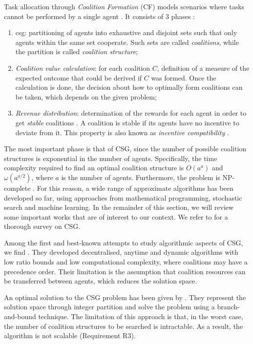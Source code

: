 Task allocation through \emph{Coalition Formation} (CF) models scenarios where tasks
cannot be performed by a single agent \cite{shehory1998}. It consists of $3$
phases \cite{sandholm1999}:
\begin{enumerate}
    \item \gls{csg}: partitioning of agents into exhaustive and disjoint sets such that
        only agents within the same set cooperate. Such sets are called \emph{coalitions},
        while the partition is called \emph{coalition structure};
    \item \emph{Coalition value calculation}: for each coalition $C$, definition of a
        measure of the expected outcome that could be derived if $C$ was formed. Once the
        calculation is done, the decision about how to optimally form coalitions can be
        taken, which depends on the given problem;
    \item \emph{Revenue distribution}: determination of the rewards for each agent in
        order to get \emph{stable} coalitions \cite{rahwan2009}. A coalition is stable if
        its agents have no incentive to deviate from it. This property is also known as
        \emph{incentive compatibility} \cite[Section $9.3.2$]{nisan2007}.
\end{enumerate}
The most important phase is that of CSG, since the number of possible coalition structures
is exponential in the number of agents. Specifically, the time complexity required
to find an optimal coalition structure is $O(a^a)$ and $\omega(a^{a/2})$, where
$a$ is the number of agents. Furthermore, the problem is NP-complete \cite{sandholm1999}.
For this reason, a wide range of approximate algorithms has been developed so far, using
approaches from mathematical programming, stochastic search and machine learning. In the
remainder of this section, we will review some important works that are of interest to our
context. We refer to \cite{rahwan2015survey} for a thorough survey on CSG.

Among the first and best-known attempts to study algorithmic aspects of CSG, we find
\cite{shehory1998}. They developed decentralised, anytime and dynamic algorithms with low
ratio bounds and low computational complexity, where coalitions may have a precedence
order. Their limitation is the assumption that coalition resources can be transferred
between agents, which reduces the solution space.

An optimal solution to the CSG problem has been given by \cite{rahwan2009}. They represent
the solution space through integer partition \cite{andrews2004} and solve the problem
using a branch-and-bound technique. The limitation of this approach is that, in the worst
case, the number of coalition structures to be searched is intractable. As a result, the
algorithm is not scalable (Requirement R3).

